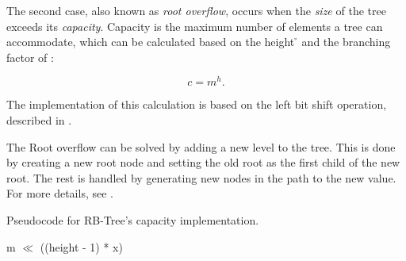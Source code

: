 The second case, also known as \emph{root overflow}, occurs when the \emph{size} of the tree exceeds its \emph{capacity}. Capacity is the maximum number of elements a tree can accommodate, which can be calculated based on the height \h{} and the branching factor \m{} of \rbtree{}:

\begin{equation}
	c = m^h.
\end{equation}

The implementation of this calculation is based on the left bit shift operation, described in .

The Root overflow can be solved by adding a new level to the tree. This is done by creating a new root node and setting the old root as the first child of the new root. The rest is handled by generating new nodes in the path to the new value. For more details, see .

\begin{listing}[ht!]
    \caption{Pseudocode for RB-Tree's capacity implementation.}
    \label{lst:rb-tree-capacity}

    \begin{algorithmic}
		\State \Return m $\ll$ ((height - 1) * x)
        \EndFunction
    \end{algorithmic}
\end{listing}

